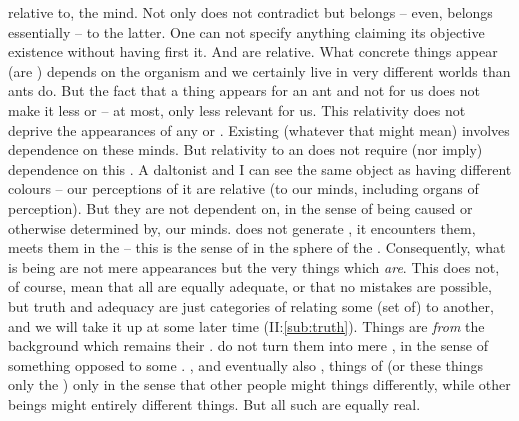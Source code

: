 relative to, the mind.  Not only  does not contradict
 but belongs -- even, belongs essentially -- to the
latter. One can not specify anything claiming its objective existence without
having first  it. And  are relative.  What
concrete things appear (are ) depends on the organism and we
certainly live in very different worlds than ants do. But the fact that a thing
appears for an ant and not for us does not make it less  or
 -- at most, only less relevant for us.  This relativity does not
deprive the appearances of any  or .
%
Existing  (whatever that might mean) involves dependence on
these minds. But relativity to an  does not require (nor imply)
dependence on this . A daltonist and I can see the same object as
having different colours -- our perceptions of it are relative (to our minds,
including organs of perception). But they are not dependent on, in the sense of
being caused or otherwise determined by, our minds.
 does not generate , it encounters them, meets
them in the  -- this is the sense of  
in the sphere of the .
%
Consequently, what is being  are not mere appearances but the
very things 
which {\em are}.  This does not, of course, mean that all  are
equally adequate, or that no mistakes are possible, but truth and adequacy are
just categories of relating some (set of)  to another, and we
will take it up at some later time (II:\ref{sub:truth}).  Things are
 {\em from} 
the background which remains their .
 do not turn them into mere , in the sense of
something opposed to some .
, and eventually also ,  things of
 (or these things  only  the
 ) only in the sense that other people might
 things differently, while other beings might 
entirely different things. But all such  are equally real. 

